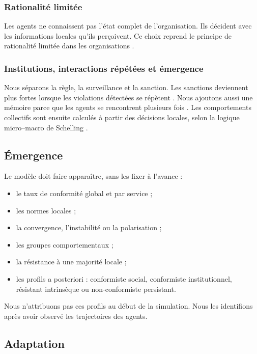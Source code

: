 \documentclass[11pt,a4paper]{article}
\begin{document}
\subsubsection{Rationalité limitée}

Les agents ne connaissent pas l’état complet de l’organisation. Ils décident
avec les informations locales qu’ils perçoivent. Ce choix reprend le principe
de rationalité limitée dans les organisations \cite{simon1997}.

\subsubsection{Institutions, interactions répétées et émergence}

Nous séparons la règle, la surveillance et la sanction. Les sanctions deviennent
plus fortes lorsque les violations détectées se répètent
\cite{ostrom1990}. Nous ajoutons aussi une mémoire parce que les agents se
rencontrent plusieurs fois \cite{axelrod2006}. Les comportements collectifs
sont ensuite calculés à partir des décisions locales, selon la logique
micro--macro de Schelling \cite{schelling2006}.

\subsection{Émergence}

Le modèle doit faire apparaître, sans les fixer à l’avance :

\begin{itemize}
  \item le taux de conformité global et par service ;
  \item les normes locales ;
  \item la convergence, l’instabilité ou la polarisation ;
  \item les groupes comportementaux ;
  \item la résistance à une majorité locale ;
  \item les profils a posteriori : conformiste social, conformiste
  institutionnel, résistant intrinsèque ou non-conformiste persistant.
\end{itemize}

Nous n’attribuons pas ces profils au début de la simulation. Nous les
identifions après avoir observé les trajectoires des agents.

\subsection{Adaptation}
\end{document}
